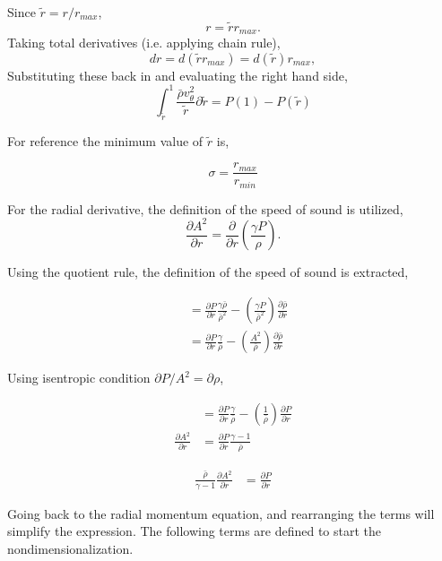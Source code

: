 \documentclass[a4paper]{report}
\begin{document}
Since $\tilde{r} = r/r_{max}$,
\[r = \tilde{r}r_{max}.\]
Taking total derivatives (i.e. applying chain rule),
\[dr = d(\tilde{r}r_{max}) = d(\tilde{r})r_{max}, \]
Substituting these back in and evaluating the right hand side,
\[
    \int_{\tilde{r}}^{1} \frac{\bar{\rho} v_{\theta}^2}{\tilde{r}}\partial \tilde{r} 
    =P(1)-P(\tilde{r})
\]

For reference the minimum value of $\tilde{r}$ is,

\[\sigma = \frac{r_{max}}{r_{min}}\]

For the radial derivative, the definition of the speed of sound is utilized,
\[\frac{\partial A^2}{\partial r } =
\frac{\partial}{\partial r} \left( \frac{\gamma P}{\rho} \right).\]

Using the quotient rule, the definition of the speed of sound is extracted,

\begin{align*}
&= \frac{\partial P}{\partial r} \frac{\gamma \bar{\rho}}{\bar{\rho}^2} -
\left(
    \frac{\gamma P}{\bar{\rho}^2} 
\right) 
\frac{\partial \bar{\rho}}{\partial r}\\
&=  \frac{\partial P}{\partial r} \frac{\gamma }{\bar{\rho}} -
\left( \frac{A^2}{\bar{\rho}} \right) 
\frac{\partial \bar{\rho} }{\partial r}
\end{align*}

Using isentropic condition $ \partial P/A^2 = \partial \rho$, 

\begin{align*}
&= \frac{\partial P}{\partial r} \frac{\gamma }{\bar{\rho}} -
\left( \frac{1}{\bar{\rho}} \right) \frac{\partial  P }{\partial r}\\
\frac{\partial A^2}{\partial r} 
&= \frac{\partial P}{\partial r} \frac{\gamma - 1}{\bar{\rho}}  
\end{align*}

\begin{align*}
    \frac{\bar{\rho}}{\gamma -1}\frac{\partial A^2}{\partial r} &= \frac{\partial P}{\partial r} 
\end{align*}


Going back to the radial momentum equation, and rearranging the terms will simplify 
the expression. The following terms are defined to start the
nondimensionalization.  
\end{document}
